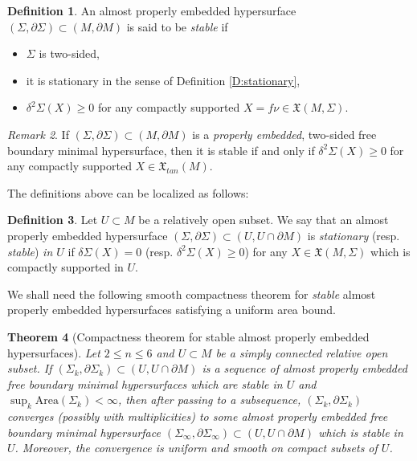 \documentclass[10pt]{amsart}
\newtheorem{theorem}{Theorem}[section]
\theoremstyle{definition}
\newtheorem{definition}[theorem]{Definition}
\theoremstyle{remark}
\newtheorem{remark}[theorem]{Remark}
\numberwithin{equation}{section}
\newcommand{\Area}{\textrm{Area}}
\begin{document}
\begin{definition}
\label{D:stable}
An almost properly embedded hypersurface $(\Sigma,\partial \Sigma) \subset (M,\partial M)$ is said to be \emph{stable} if 
\begin{itemize}
\item $\Sigma$ is two-sided,
\item it is stationary in the sense of Definition \ref{D:stationary},
\item $\delta^2 \Sigma(X) \geq 0$ for any compactly supported $X=f\nu \in \mathfrak{X}(M,\Sigma)$.
\end{itemize}
\end{definition}

\begin{remark}
If $(\Sigma,\partial \Sigma) \subset (M,\partial M)$ is a \emph{properly embedded}, two-sided free boundary minimal hypersurface, then it is stable if and only if $\delta^2 \Sigma(X) \geq 0$ for any compactly supported $X \in \mathfrak{X}_{tan}(M)$.
\end{remark}

The definitions above can be localized as follows: 

\begin{definition}
Let $U \subset M$ be a relatively open subset. We say that an almost properly embedded hypersurface $(\Sigma,\partial \Sigma) \subset (U,U \cap \partial M)$ is \emph{stationary} (resp. \emph{stable}) \emph{in $U$} if $\delta \Sigma(X)=0$ (resp. $\delta^2 \Sigma (X) \geq 0$) for any $X \in \mathfrak{X}(M,\Sigma)$ which is compactly supported in $U$.
\end{definition}

We shall need the following smooth compactness theorem for \emph{stable} almost properly embedded hypersurfaces satisfying a uniform area bound.

\begin{theorem}[Compactness theorem for stable almost properly embedded hypersurfaces]
\label{T:freebdy-cpt}
Let $2 \leq n \leq 6$ and $U \subset M$ be a simply connected relative open subset. If $(\Sigma_k,\partial \Sigma_k) \subset (U,U \cap \partial M)$ is a sequence of almost properly embedded free boundary minimal hypersurfaces which are stable in $U$ and $\sup_{k} \Area(\Sigma_k) < \infty$, 
then after passing to a subsequence, $(\Sigma_k,\partial \Sigma_k)$ converges (possibly with multiplicities) to some almost properly embedded free boundary minimal hypersurface $(\Sigma_\infty,\partial \Sigma_\infty) \subset (U,U \cap \partial M)$ which is stable in $U$. Moreover, the convergence is uniform and smooth on compact subsets of $U$.
\end{theorem}
\end{document}
